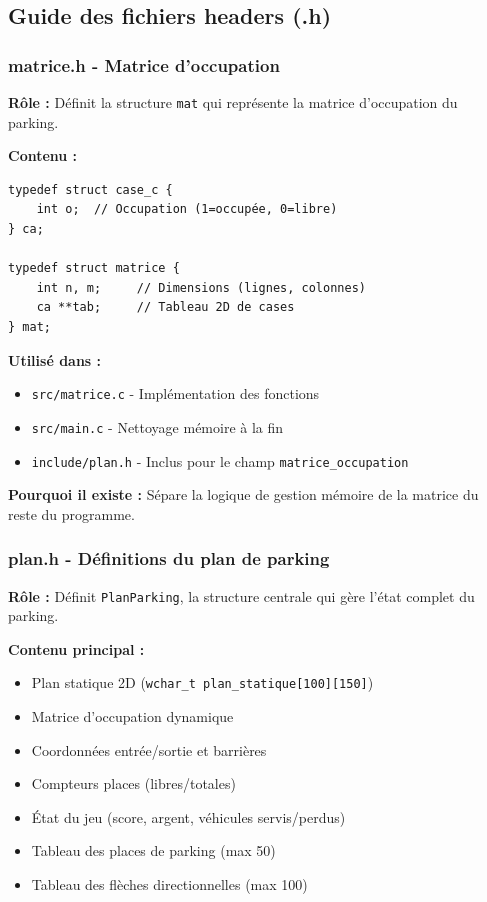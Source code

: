 \documentclass[12pt,a4paper]{article}
\begin{document}
\subsection{Guide des fichiers headers (.h)}

\subsubsection{matrice.h - Matrice d'occupation}

\textbf{Rôle :} Définit la structure \texttt{mat} qui représente la matrice d'occupation du parking.

\textbf{Contenu :}
\begin{lstlisting}
typedef struct case_c {
    int o;  // Occupation (1=occupée, 0=libre)
} ca;

typedef struct matrice {
    int n, m;     // Dimensions (lignes, colonnes)
    ca **tab;     // Tableau 2D de cases
} mat;
\end{lstlisting}

\textbf{Utilisé dans :}
\begin{itemize}
    \item \texttt{src/matrice.c} - Implémentation des fonctions
    \item \texttt{src/main.c} - Nettoyage mémoire à la fin
    \item \texttt{include/plan.h} - Inclus pour le champ \texttt{matrice\_occupation}
\end{itemize}

\textbf{Pourquoi il existe :} Sépare la logique de gestion mémoire de la matrice du reste du programme.

\subsubsection{plan.h - Définitions du plan de parking}

\textbf{Rôle :} Définit \texttt{PlanParking}, la structure centrale qui gère l'état complet du parking.

\textbf{Contenu principal :}
\begin{itemize}
    \item Plan statique 2D (\texttt{wchar\_t plan\_statique[100][150]})
    \item Matrice d'occupation dynamique
    \item Coordonnées entrée/sortie et barrières
    \item Compteurs places (libres/totales)
    \item État du jeu (score, argent, véhicules servis/perdus)
    \item Tableau des places de parking (max 50)
    \item Tableau des flèches directionnelles (max 100)
\end{itemize}
\end{document}

